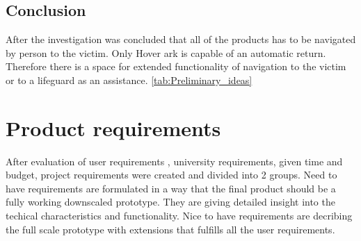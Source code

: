 \subsection{Conclusion}
After the investigation was concluded that all of the products has to be navigated by person to the victim. 
Only Hover ark is capable of an automatic return. Therefore there is a space for extended functionality of navigation to the victim or to a lifeguard as an assistance. 
\ref{tab:Preliminary_ideas}
\section{Product requirements}
After evaluation of user requirements , university requirements, given time and budget, project requirements were created and divided 
into 2 groups. Need to have requirements are formulated in a way that the final product should be a fully working downscaled prototype. 
They are giving detailed insight into the techical characteristics and functionality. Nice to 
have requirements are decribing the full scale prototype with extensions that fulfills all the user requirements.
